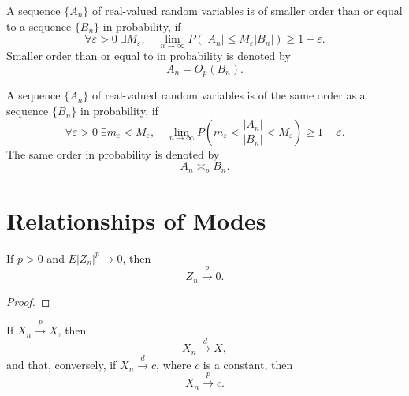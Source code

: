 \begin{definition}
	A sequence $\{A_n\}$ of real-valued random variables is of smaller order than or equal to a sequence $\{B_n\}$ in probability, if
	\begin{equation}
		\forall\varepsilon>0\;\exists M_\varepsilon,\quad\lim_{n\rightarrow\infty} P\left(|A_n|\leq M_\varepsilon|B_n|\right)\geq 1-\varepsilon.
	\end{equation}
	Smaller order than or equal to in probability is denoted by
	\begin{equation}
		A_n=O_p(B_n).
	\end{equation}
\end{definition}

\begin{definition}
	A sequence $\{A_n\}$ of real-valued random variables is of the same order as a sequence $\{B_n\}$ in probability, if
	\begin{equation}
		\forall\varepsilon>0\;\exists m_{\varepsilon}<M_{\varepsilon},\quad\lim_{n\rightarrow\infty} P\left(m_{\varepsilon}<\frac{|A_{n}|}{|B_{n}|}<M_{\varepsilon}\right)\geq 1-\varepsilon.
	\end{equation}
	The same order in probability is denoted by
	\begin{equation}
		A_{n}\asymp_{p}B_{n}.
	\end{equation}
\end{definition}

\section{Relationships of Modes}

\begin{lemma}
	If $p>0$ and $E\left|Z_{n}\right|^{p}\rightarrow 0$, then
	\begin{equation}
		Z_{n}\stackrel{p}{\rightarrow}0.
	\end{equation}
\end{lemma}

\begin{proof}

\end{proof}

\begin{theorem}
	If $X_{n}\stackrel{p}{\rightarrow}X$, then
	\begin{equation}
		X_{n}\stackrel{d}{\rightarrow}X,
	\end{equation}
	and that, conversely, if $X_{n}\stackrel{d}{\rightarrow}c$, where $c$ is a constant, then
	\begin{equation}
		X_{n}\stackrel{p}{\rightarrow}c.
	\end{equation}
\end{theorem}

